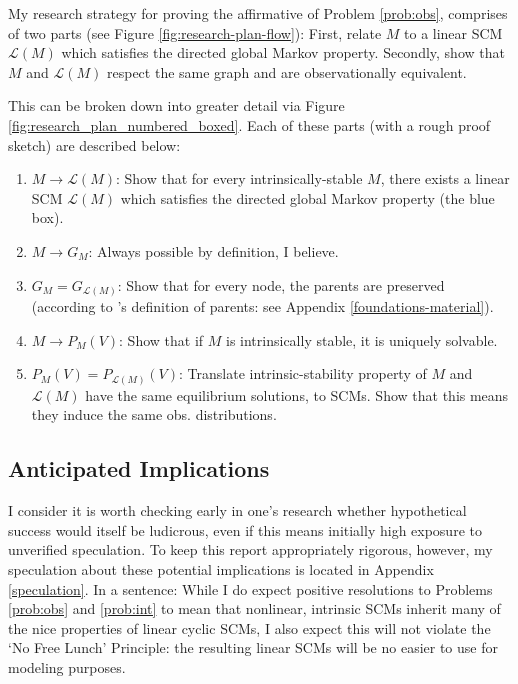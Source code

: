 \documentclass[letterpaper,10pt]{article}
\begin{document}
My research strategy for proving the affirmative of Problem \ref{prob:obs}, comprises of two parts (see Figure \ref{fig:research-plan-flow}): First, relate $M$ to a linear SCM $\mathcal{L}(M)$ which satisfies the directed global Markov property. Secondly, show that $M$ and $\mathcal{L}(M)$ respect the same graph and are observationally equivalent.

This can be broken down into greater detail via Figure \ref{fig:research_plan_numbered_boxed}. Each of these parts (with a rough proof sketch) are described below:

\begin{enumerate}
  \item $M\rightarrow \mathcal{L}(M)$: Show that for every intrinsically-stable $M$, there exists a linear SCM $\mathcal{L}(M)$ which satisfies the directed global Markov property (the blue box).
  \item $M\rightarrow G_M$: Always possible by definition, I believe.
  \item $G_M = G_{\mathcal{L}(M)}$: Show that for every node, the parents are preserved (according to \cite{Foundations}'s definition of parents: see Appendix \ref{foundations-material}).
  \item $M \rightarrow P_M(V)$: Show that if $M$ is intrinsically stable, it is uniquely solvable.
  \item $P_M(V) = P_{\mathcal{L}(M)}(V)$: Translate intrinsic-stability property of $M$ and $\mathcal{L}(M)$ have the same equilibrium solutions, to SCMs. Show that this means they induce the same obs. distributions.
\end{enumerate}

\subsection{Anticipated Implications}

I consider it is worth checking early in one's research whether hypothetical success would itself be ludicrous, even if this means initially high exposure to unverified speculation.
To keep this report appropriately rigorous, however, my speculation about these potential implications is located in Appendix \ref{speculation}.
In a sentence: While I do expect positive resolutions to Problems \ref{prob:obs} and \ref{prob:int} to mean that nonlinear, intrinsic SCMs inherit many of the nice properties of linear cyclic SCMs, I also expect this will not violate the `No Free Lunch' Principle: the resulting linear SCMs will be no easier to use for modeling purposes.
\end{document}
